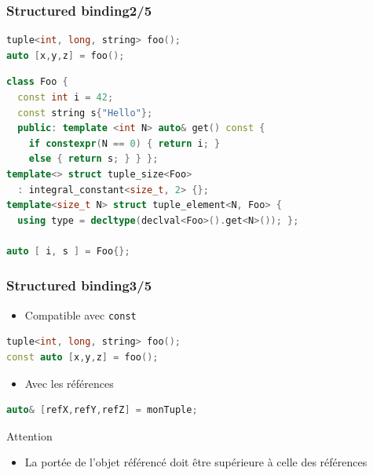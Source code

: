 \documentclass[C++.tex]{subfiles}
\begin{document}
\begin{frame}[fragile]
	\frametitle{Structured binding\titlehfill{}2/5}
	\begin{lstlisting}[language=C++]
tuple<int, long, string> foo();
auto [x,y,z] = foo();\end{lstlisting}

	\begin{lstlisting}[language=C++]
class Foo {
  const int i = 42;
  const string s{"Hello"}; 
  public: template <int N> auto& get() const {
    if constexpr(N == 0) { return i; }
    else { return s; } } };
template<> struct tuple_size<Foo>
  : integral_constant<size_t, 2> {};
template<size_t N> struct tuple_element<N, Foo> {
  using type = decltype(declval<Foo>().get<N>()); };

auto [ i, s ] = Foo{};\end{lstlisting}

\end{frame}

\begin{frame}[fragile]
	\frametitle{Structured binding\titlehfill{}3/5}
	\begin{itemize}
		\item Compatible avec \lstinline|const|
	\end{itemize}

	\begin{lstlisting}[language=C++]
tuple<int, long, string> foo();
const auto [x,y,z] = foo();\end{lstlisting}

	\begin{itemize}
		\item Avec les références
	\end{itemize}

	\begin{lstlisting}[language=C++]
auto& [refX,refY,refZ] = monTuple;\end{lstlisting}

	\begin{alertblock}{Attention}
		\begin{itemize}
			\item La portée de l'objet référencé doit être supérieure à celle des références
		\end{itemize}
	\end{alertblock}
\end{frame}
\end{document}
